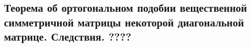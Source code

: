 {
\subsection{Теорема об ортогональном подобии вещественной симметричной матрицы некоторой диагональной матрице. Следствия. ????}
}